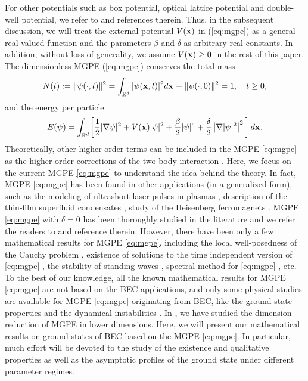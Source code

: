 \documentclass{elsarticle}
\newcommand{\be}{\begin{equation}}
\newcommand{\ee}{\end{equation}}
\newcommand{\bx}{{\bf x} }
\begin{document}
For other potentials such as box potential, optical lattice potential and double-well potential,
we refer to \cite{Bao2013,PitaevskiiStringari} and references therein.
Thus, in the subsequent discussion, we will treat
the external potential $V(\bx)$ in (\ref{eq:mgpe})
as  a general real-valued function and the parameters $\beta$ and $\delta$  as
arbitrary real constants.  In addition,
without loss of generality, we assume $V(\bx)\ge0$  %
in the rest of this paper.
The dimensionless MGPE (\ref{eq:mgpe}) conserves the total mass
 \be\label{eq:mass}
N(t):=\|\psi(\cdot,t)\|^2=\int_{{\mathbb R}^d}|\psi(\bx,t)|^2d\bx
\equiv \|\psi(\cdot,0)\|^2=1, \quad t\ge0, \ee
and the energy per particle
\be \label{eq:energy}
E(\psi)=\int_{{\mathbb R}^d}\biggl[
\frac12|\nabla\psi|^2+V(\bx)|\psi|^2+\frac{\beta}{2}|\psi|^4+\frac{\delta}{2}\left|\nabla|\psi|^2\right|^2\biggl]\,d\bx.
\ee
Theoretically, other higher order terms  can be included in the MGPE \eqref{eq:mgpe} as the higher order corrections of
the two-body interaction \cite{Collin}. Here, we focus on the current MGPE \eqref{eq:mgpe} to understand the idea behind the theory.
In fact, MGPE \eqref{eq:mgpe} has  been found in other applications (in a generalized form), such as the modeling of
ultrashort laser pulses in plasmas \cite{Borov,De}, description of the thin-film superfluid condensates  \cite{Kuri}, study of the
Heisenberg ferromagnets \cite{Takeno}.
MGPE \eqref{eq:mgpe} with $\delta=0$ has been thoroughly studied in the literature
and we refer the readers to \cite{Bao2013,Bao2014,PitaevskiiStringari} and reference therein.
However, there have been only a few mathematical results for
 MGPE \eqref{eq:mgpe}, including the local well-posedness of the Cauchy problem \cite{Popp,Marz}, existence
 of  solutions to the time independent version of \eqref{eq:mgpe} \cite{Liu,Liu2}, the stability of standing waves \cite{ColinM},
 spectral method for \eqref{eq:mgpe} \cite{Lu}, etc.
 To the best of our knowledge, all the known mathematical results for MGPE \eqref{eq:mgpe}
 are not based on the BEC  applications, and only some physical studies are available for MGPE \eqref{eq:mgpe} originating from BEC,
 like the ground state properties \cite{Fu,Tho} and the dynamical instabilities \cite{Qi,Qix}. In \cite{Ruan}, we have studied the dimension reduction of MGPE in lower dimensions.
 Here, we will present
our mathematical results on ground states of BEC based on
the MGPE \eqref{eq:mgpe}.
In particular, much effort will be devoted to the study of the existence and qualitative properties as well as the asymptotic profiles of the ground state under different parameter regimes.
\end{document}
